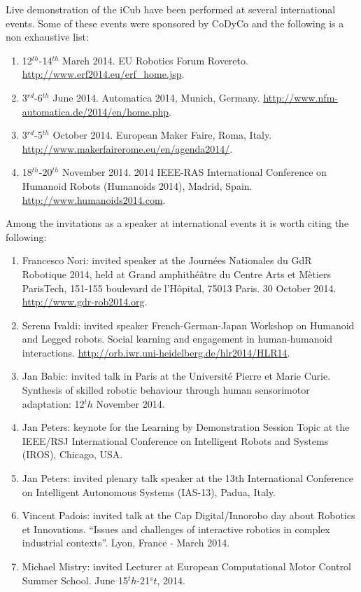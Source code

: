 \documentclass[12pt,a4paper,twoside]{article}
\begin{document}
Live demonstration of the iCub have been performed at several international events.  Some of these events were sponsored by CoDyCo and the following is a non exhaustive list:

\begin{enumerate}

\item 12$^{th}$-14$^{th}$ March 2014. EU Robotics Forum Rovereto. \url{http://www.erf2014.eu/erf_home.jsp}.
\item 3$^{rd}$-6$^{th}$ June 2014. Automatica 2014, Munich, Germany. \url{http://www.nfm-automatica.de/2014/en/home.php}.
\item 3$^{rd}$-5$^{th}$ October 2014. European Maker Faire, Roma, Italy. \url{http://www.makerfairerome.eu/en/agenda2014/}. 
\item 18$^{th}$-20$^{th}$ November 2014. 2014 IEEE-RAS International Conference on Humanoid Robots (Humanoids 2014), Madrid, Spain. \url{http://www.humanoids2014.com}.

\end{enumerate} 

Among the invitations as a speaker at international events it is worth citing the following:

\begin{enumerate}

\item Francesco Nori: invited speaker at the Journées Nationales du GdR Robotique 2014, held at Grand amphith\'e\^atre du Centre Arts et M\`etiers ParisTech, 151-155 boulevard de l'Hôpital, 75013 Paris. 30 October 2014. \url{http://www.gdr-rob2014.org}.

\item Serena Ivaldi: invited speaker French-German-Japan Workshop on Humanoid and Legged robots. Social learning and engagement in human-humanoid interactions. \url{http://orb.iwr.uni-heidelberg.de/hlr2014/HLR14}.

\item Jan Babic: invited talk in Paris at the Université Pierre et Marie Curie. Synthesis of skilled robotic behaviour through human sensorimotor adaptation:  12$^th$ November 2014.

\item Jan Peters: keynote for the Learning by Demonstration Session Topic at the IEEE/RSJ International Conference on Intelligent Robots and Systems (IROS), Chicago, USA.

\item Jan Peters: invited plenary talk speaker at the 13th International Conference on Intelligent Autonomous Systems (IAS-13), Padua, Italy.

\item Vincent Padois: invited talk at the Cap Digital/Innorobo day about Robotics et Innovations. ``Issues and challenges of interactive robotics in complex industrial contexts''. Lyon, France - March 2014.

\item Michael Mistry: invited Lecturer at European Computational Motor Control Summer School. June 15$^th$-21$^st$, 2014.

\end{enumerate} 
\end{document}
